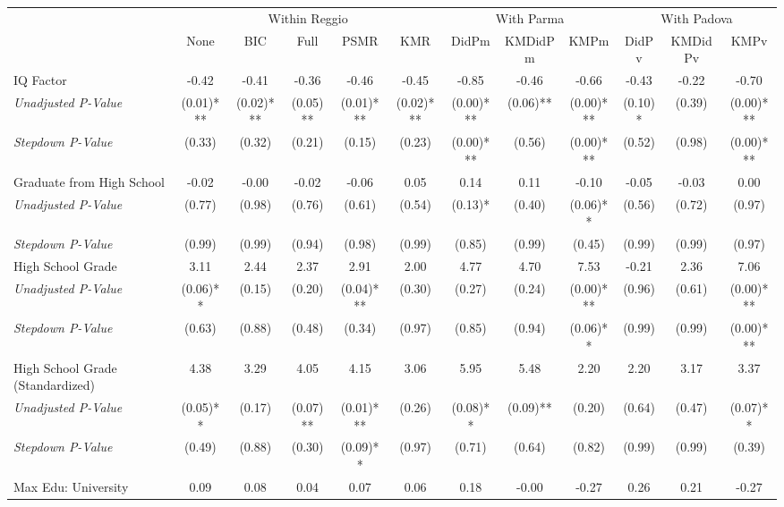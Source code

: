 \begin{tabular}{l c c c c c c c c c c c}
\toprule
& \multicolumn{5}{c}{Within Reggio} & \multicolumn{3}{c}{With Parma} & \multicolumn{3}{c}{With Padova} \\\cmidrule(lr){2-6} \cmidrule(lr){7-9} \cmidrule(lr){10-12}
 & None & BIC & Full & PSMR & KMR & DidPm & KMDidPm & KMPm & DidPv & KMDidPv & KMPv \\
\midrule
IQ Factor & -0.42 & -0.41 & -0.36 & -0.46 & -0.45 & -0.85 & -0.46 & -0.66 & -0.43 & -0.22 & -0.70 \\
\quad \textit{Unadjusted P-Value} & (0.01)*** & (0.02)*** & (0.05)** & (0.01)*** & (0.02)*** & (0.00)*** & (0.06)** & (0.00)*** & (0.10)* & (0.39) & (0.00)*** \\
\quad \textit{Stepdown P-Value} & (0.33) & (0.32) & (0.21) & (0.15) & (0.23) & (0.00)*** & (0.56) & (0.00)*** & (0.52) & (0.98) & (0.00)*** \\
Graduate from High School & -0.02 & -0.00 & -0.02 & -0.06 & 0.05 & 0.14 & 0.11 & -0.10 & -0.05 & -0.03 & 0.00 \\
\quad \textit{Unadjusted P-Value} & (0.77) & (0.98) & (0.76) & (0.61) & (0.54) & (0.13)* & (0.40) & (0.06)** & (0.56) & (0.72) & (0.97) \\
\quad \textit{Stepdown P-Value} & (0.99) & (0.99) & (0.94) & (0.98) & (0.99) & (0.85) & (0.99) & (0.45) & (0.99) & (0.99) & (0.97) \\
High School Grade & 3.11 & 2.44 & 2.37 & 2.91 & 2.00 & 4.77 & 4.70 & 7.53 & -0.21 & 2.36 & 7.06 \\
\quad \textit{Unadjusted P-Value} & (0.06)** & (0.15) & (0.20) & (0.04)*** & (0.30) & (0.27) & (0.24) & (0.00)*** & (0.96) & (0.61) & (0.00)*** \\
\quad \textit{Stepdown P-Value} & (0.63) & (0.88) & (0.48) & (0.34) & (0.97) & (0.85) & (0.94) & (0.06)** & (0.99) & (0.99) & (0.00)*** \\
High School Grade (Standardized) & 4.38 & 3.29 & 4.05 & 4.15 & 3.06 & 5.95 & 5.48 & 2.20 & 2.20 & 3.17 & 3.37 \\
\quad \textit{Unadjusted P-Value} & (0.05)** & (0.17) & (0.07)** & (0.01)*** & (0.26) & (0.08)** & (0.09)** & (0.20) & (0.64) & (0.47) & (0.07)** \\
\quad \textit{Stepdown P-Value} & (0.49) & (0.88) & (0.30) & (0.09)** & (0.97) & (0.71) & (0.64) & (0.82) & (0.99) & (0.99) & (0.39) \\
Max Edu: University & 0.09 & 0.08 & 0.04 & 0.07 & 0.06 & 0.18 & -0.00 & -0.27 & 0.26 & 0.21 & -0.27 \\

\end{tabular}
